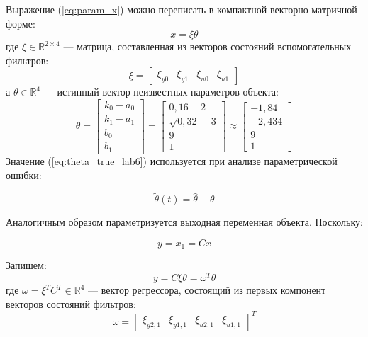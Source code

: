 \documentclass[a4paper,12pt]{article}
\begin{document}
Выражение (\ref{eq:param_x}) можно переписать в компактной векторно-матричной форме:
\begin{equation}
	x = \xi \theta
	\label{eq:x_xi_theta}
\end{equation}
где $\xi \in \mathbb{R}^{2 \times 4}$ --- матрица, составленная из векторов состояний вспомогательных фильтров:
\begin{equation}
	\xi = \begin{bmatrix} \xi_{y0} & \xi_{y1} & \xi_{u0} & \xi_{u1} \end{bmatrix}
\end{equation}
а $\theta \in \mathbb{R}^4$ --- истинный вектор неизвестных параметров объекта:
\begin{equation}
	\theta = \begin{bmatrix} k_0 - a_0 \\ k_1 - a_1 \\ b_0 \\ b_1 \end{bmatrix} = \begin{bmatrix} 0{,}16 - 2 \\ \sqrt{0{,}32} - 3 \\ 9 \\ 1 \end{bmatrix} \approx \begin{bmatrix} -1{,}84 \\ -2{,}434 \\ 9 \\ 1 \end{bmatrix}
	\label{eq:theta_true_lab6}
\end{equation}
Значение (\ref{eq:theta_true_lab6}) используется при анализе параметрической ошибки:

\begin{equation}
	\tilde{\theta}(t) = \hat \theta - \theta
	\label{eq:bar_theta}
\end{equation}


Аналогичным образом параметризуется выходная переменная объекта. Поскольку:

\[y = x_1 = C x\] 


Запишем:
\begin{equation}
	y = C \xi \theta = \omega^T \theta
	\label{eq:y_omega_theta}
\end{equation}
где $\omega = \xi^T C^T \in \mathbb{R}^4$ --- вектор регрессора, состоящий из первых компонент векторов состояний фильтров:
\begin{equation}
	\omega = \begin{bmatrix} \xi_{y2, 1} & \xi_{y1, 1} & \xi_{u2, 1} & \xi_{u1, 1} \end{bmatrix}^T
\end{equation}
\end{document}
